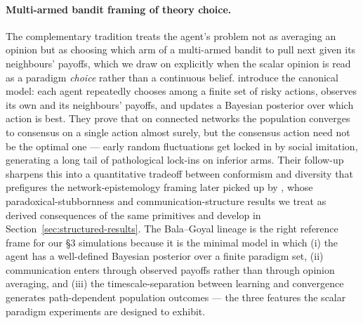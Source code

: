 \paragraph{Multi-armed bandit framing of theory choice.}
The complementary tradition treats the agent's problem not as
averaging an opinion but as choosing which arm of a multi-armed
bandit to pull next given its neighbours' payoffs, which we draw on
explicitly when the scalar opinion is read as a paradigm \emph{choice}
rather than a continuous belief. \citet{Bala1998_1} introduce the
canonical model: each agent repeatedly chooses among a finite set of
risky actions, observes its own and its neighbours' payoffs, and
updates a Bayesian posterior over which action is best. They prove
that on connected networks the population converges to consensus on a
single action almost surely, but the consensus action need not be the
optimal one --- early random fluctuations get locked in by social
imitation, generating a long tail of pathological lock-ins on
inferior arms. Their follow-up \citep{Bala2001_3} sharpens this into
a quantitative tradeoff between conformism and diversity that
prefigures the network-epistemology framing later picked up by
\citet{zollman2007CommunicationStructure}, whose paradoxical-stubbornness and
communication-structure results we treat as derived consequences of
the same primitives and develop in
Section~\ref{sec:structured-results}. The Bala--Goyal lineage is the
right reference frame for our §3 simulations because it is the
minimal model in which (i) the agent has a well-defined Bayesian
posterior over a finite paradigm set, (ii) communication enters
through observed payoffs rather than through opinion averaging, and
(iii) the timescale-separation between learning and convergence
generates path-dependent population outcomes --- the three features
the scalar paradigm experiments are designed to exhibit.


